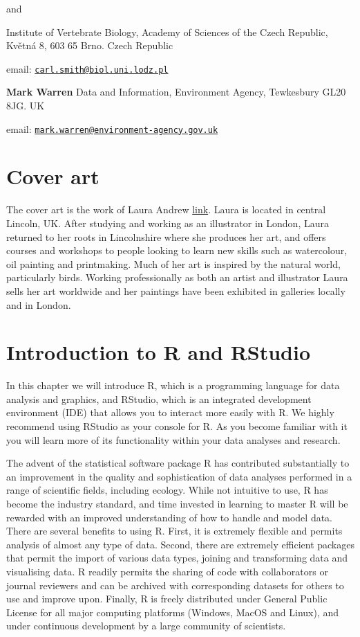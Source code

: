 \documentclass[
]{book}
\begin{document}
and

Institute of Vertebrate Biology, Academy of Sciences of the Czech
Republic, Květná 8, 603 65 Brno. Czech Republic

email:
\href{mailto:carl.smith@biol.uni.lodz.pl}{\nolinkurl{carl.smith@biol.uni.lodz.pl}}

\textbf{Mark Warren} Data and Information, Environment Agency,
Tewkesbury GL20 8JG. UK

email:
\href{mailto:mark.warren@environment-agency.gov.uk}{\nolinkurl{mark.warren@environment-agency.gov.uk}}

\hypertarget{cover-art}{%
\chapter*{Cover art}\label{cover-art}}

The cover art is the work of Laura Andrew
\href{www.lauraandrew.com}{link}. Laura is located in central Lincoln,
UK. After studying and working as an illustrator in London, Laura
returned to her roots in Lincolnshire where she produces her art, and
offers courses and workshops to people looking to learn new skills such
as watercolour, oil painting and printmaking. Much of her art is
inspired by the natural world, particularly birds. Working
professionally as both an artist and illustrator Laura sells her art
worldwide and her paintings have been exhibited in galleries locally and
in London.

\hypertarget{intro1}{%
\chapter{Introduction to R and RStudio}\label{intro1}}

In this chapter we will introduce R, which is a programming language for
data analysis and graphics, and RStudio, which is an integrated
development environment (IDE) that allows you to interact more easily
with R. We highly recommend using RStudio as your console for R. As you
become familiar with it you will learn more of its functionality within
your data analyses and research.

The advent of the statistical software package R has contributed
substantially to an improvement in the quality and sophistication of
data analyses performed in a range of scientific fields, including
ecology. While not intuitive to use, R has become the industry standard,
and time invested in learning to master R will be rewarded with an
improved understanding of how to handle and model data. There are
several benefits to using R. First, it is extremely flexible and permits
analysis of almost any type of data. Second, there are extremely
efficient packages that permit the import of various data types, joining
and transforming data and visualising data. R readily permits the
sharing of code with collaborators or journal reviewers and can be
archived with corresponding datasets for others to use and improve upon.
Finally, R is freely distributed under General Public License for all
major computing platforms (Windows, MacOS and Linux), and under
continuous development by a large community of scientists.
\end{document}
